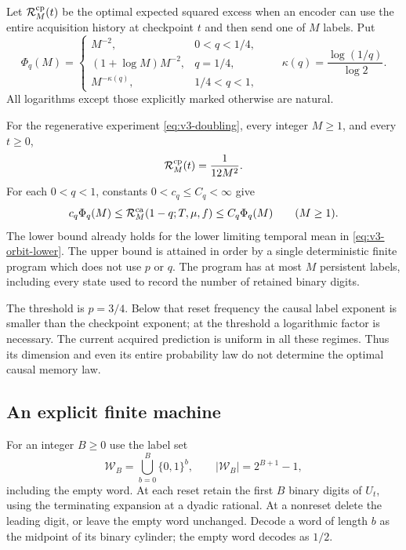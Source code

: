 Let $\mathcal R_M^{\rm cp}(t)$ be the optimal expected squared excess
when an encoder can use the entire acquisition history at checkpoint $t$
and then send one of $M$ labels. Put
\begin{equation}\label{eq:v3-phase-profile}
 \Phi_q(M)=
 \begin{cases}
 M^{-2},&0<q<1/4,\\
 (1+\log M)M^{-2},&q=1/4,\\
 M^{-\kappa(q)},&1/4<q<1,
 \end{cases}
 \qquad \kappa(q)=\dfrac{\log(1/q)}{\log2}.
\end{equation}
All logarithms except those explicitly marked otherwise are natural.

\begin{theorem}
\label{thm:v3-phase}
For the regenerative experiment \eqref{eq:v3-doubling}, every integer
$M\ge1$, and every $t\ge0$,
\begin{equation}\label{eq:v3-checkpoint-exact}
 \mathcal R_M^{\rm cp}(t)=\frac1{12M^2}.
\end{equation}
For each $0<q<1$, constants $0<c_q\le C_q<\infty$ give
\begin{equation}\label{eq:v3-phase-law}
 c_q\Phi_q(M)\le
 \mathcal R_M^{\rm ca}(1-q;T,\mu,f)
 \le C_q\Phi_q(M)\qquad(M\ge1).
\end{equation}
The lower bound already holds for the lower limiting temporal mean in
\eqref{eq:v3-orbit-lower}. The upper bound is attained in order by a
single deterministic finite program which does not use $p$ or $q$.
The program has at most $M$ persistent labels, including every state used
to record the number of retained binary digits.
\end{theorem}

The threshold is $p=3/4$. Below that reset frequency the causal label
exponent is smaller than the checkpoint exponent; at the threshold a
logarithmic factor is necessary. The current acquired prediction is
uniform in all these regimes. Thus its dimension and even its entire
probability law do not determine the optimal causal memory law.

\subsection{An explicit finite machine}
For an integer $B\ge0$ use the label set
\[
 \mathcal W_B=\bigcup_{b=0}^B\{0,1\}^b,
 \qquad |\mathcal W_B|=2^{B+1}-1,
\]
including the empty word. At each reset retain the first $B$ binary digits
of $U_t$, using the terminating expansion at a dyadic rational. At a
nonreset delete the leading digit, or leave the empty word unchanged.
Decode a word of length $b$ as the midpoint of its binary cylinder; the
empty word decodes as $1/2$.

